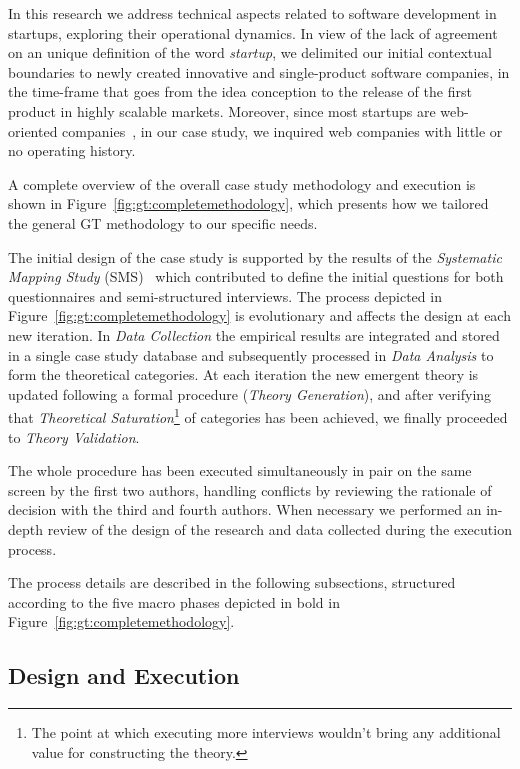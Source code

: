\documentclass[10pt,journal,letterpaper,compsoc]{IEEEtran}
\begin{document}
In this research we address technical aspects related to software development
in startups, exploring their operational dynamics. In view of the lack of
agreement on an unique definition of the word \textit{startup}, we delimited our
initial contextual boundaries to newly created innovative and single-product
software companies, in the time-frame that goes from the idea conception to the
release of the first product in highly scalable markets. Moreover, since most
startups are web-oriented companies~\cite{tc-webstartups-link, Allen2003}, in
our case study, we inquired web companies with little or no operating history.

A complete overview of the overall case study methodology and execution is
shown in Figure~\ref{fig:gt:completemethodology}, which presents how we tailored
the general GT methodology to our specific needs.


The initial design of the case study is supported by the results of the
\textit{Systematic Mapping Study} (SMS)~\cite{SMS} which contributed to define
the initial questions for both questionnaires and semi-structured interviews.
The process depicted in Figure~\ref{fig:gt:completemethodology} is evolutionary
and affects the design at each new iteration. In \textit{Data Collection} the
empirical results are integrated and stored in a single case study database and
subsequently processed in \textit{Data Analysis} to form the theoretical
categories. At each iteration the new emergent theory is updated following a
formal procedure (\textit{Theory Generation}), and after verifying that
\textit{Theoretical Saturation}\footnote{The point at which executing more
interviews wouldn't bring any additional value for constructing the theory.} of
categories has been achieved, we finally proceeded to \textit{Theory
Validation}.

The whole procedure has been executed simultaneously in pair on the same screen
by the first two authors, handling conflicts by reviewing the rationale of
decision with the third and fourth authors. When necessary we performed an 
in-depth review of the design of the research and data collected during the
execution process.

The process details are described in the following subsections, structured
according to the five macro phases depicted in bold in 
Figure~\ref{fig:gt:completemethodology}.



\subsection{Design and Execution} \label{desex}
\end{document}
